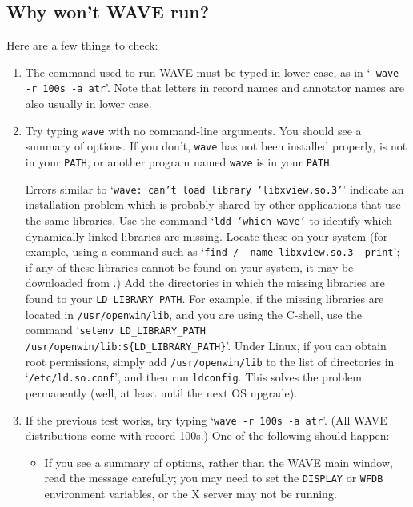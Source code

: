 \documentclass[twoside]{book}
\newcommand{\WAVE}{{\sf WAVE}\xspace}
\begin{document}
\subsection{Why won't \WAVE{} run?}

Here are a few things to check:

\begin{enumerate}
\item
{}
The command used to run \WAVE{} must be typed in lower case, as in `{\tt
wave -r 100s -a atr}'.  Note that letters in record names and
annotator names are also usually in lower case.

\item
{}
Try typing {\tt wave} with no command-line arguments.  You should see a summary
of options.  If you don't, {\tt wave} has not been installed properly, is not
in your {\tt PATH}, or another program named {\tt wave} is in your {\tt PATH}.

Errors similar to `{\tt wave: can't load library 'libxview.so.3'}'
indicate an installation problem which is probably shared by other
applications that use the same libraries.
Use the command `{\tt ldd `which wave`} to identify which dynamically
linked libraries are missing.  Locate these on your system (for
example, using a command such as `{\tt find / -name libxview.so.3
-print}';  if any of these libraries cannot be found on your system, it may be
downloaded from .)
Add the directories in which the missing libraries are found to your
{\tt LD\_LIBRARY\_PATH}.  For example, if the missing libraries are
located in {\tt /usr/openwin/lib}, and you are using the C-shell, use the
command `{\tt setenv LD\_LIBRARY\_PATH /usr/openwin/lib:\$\{LD\_LIBRARY\_PATH\}}'.
Under Linux, if you can obtain root permissions, simply add
{\tt /usr/openwin/lib} to the list of directories in `{\tt /etc/ld.so.conf}',
and then run {\tt ldconfig}.  This solves the problem permanently (well, at
least until the next OS upgrade).

\item
If the previous test works, try typing `{\tt wave -r 100s -a atr}'.  (All
\WAVE{} distributions come with record 100s.)  One of the following should
happen:
\begin{itemize}
\item
{}
If you see a summary of options, rather than the \WAVE{} main window, read
the message carefully;  you may need to set the {\tt DISPLAY} or {\tt WFDB}
environment variables, or the X server may not be running.


\end{itemize}
\end{enumerate}
\end{document}
